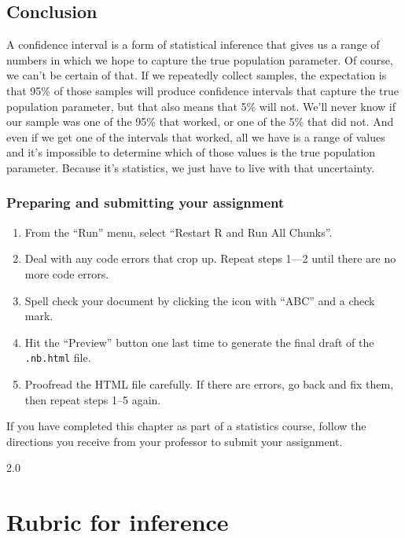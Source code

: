 \documentclass[
]{book}
\providecommand{\tightlist}{%
  \setlength{\itemsep}{0pt}\setlength{\parskip}{0pt}}
\begin{document}
\hypertarget{ci-conclusion}{%
\section{Conclusion}\label{ci-conclusion}}

A confidence interval is a form of statistical inference that gives us a range of numbers in which we hope to capture the true population parameter. Of course, we can't be certain of that. If we repeatedly collect samples, the expectation is that 95\% of those samples will produce confidence intervals that capture the true population parameter, but that also means that 5\% will not. We'll never know if our sample was one of the 95\% that worked, or one of the 5\% that did not. And even if we get one of the intervals that worked, all we have is a range of values and it's impossible to determine which of those values is the true population parameter. Because it's statistics, we just have to live with that uncertainty.

\hypertarget{ci-prep}{%
\subsection{Preparing and submitting your assignment}\label{ci-prep}}

\begin{enumerate}
\def\labelenumi{\arabic{enumi}.}
\tightlist
\item
  From the ``Run'' menu, select ``Restart R and Run All Chunks''.
\item
  Deal with any code errors that crop up. Repeat steps 1---2 until there are no more code errors.
\item
  Spell check your document by clicking the icon with ``ABC'' and a check mark.
\item
  Hit the ``Preview'' button one last time to generate the final draft of the \texttt{.nb.html} file.
\item
  Proofread the HTML file carefully. If there are errors, go back and fix them, then repeat steps 1--5 again.
\end{enumerate}

If you have completed this chapter as part of a statistics course, follow the directions you receive from your professor to submit your assignment.

\hypertarget{appendix-appendix}{%
\appendix}


2.0

\hypertarget{appendix-rubric}{%
\chapter{Rubric for inference}\label{appendix-rubric}}
\end{document}
